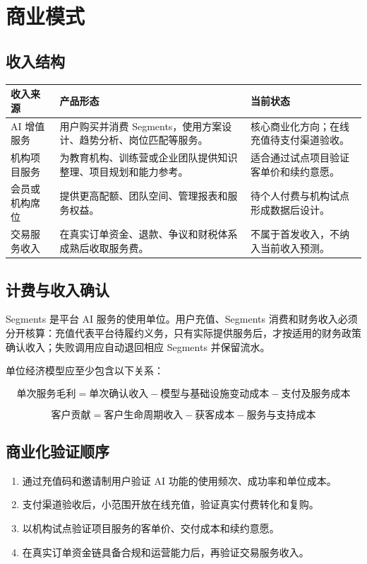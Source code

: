 \documentclass[12pt,a4paper,openany,fontset=fandol]{ctexrep}
\begin{document}
\chapter{商业模式}

\section{收入结构}

\begin{longtable}{p{3.2cm} p{5.2cm} p{5.3cm}}
\toprule
收入来源 & 产品形态 & 当前状态 \\
\midrule
AI 增值服务 & 用户购买并消费 Segments，使用方案设计、趋势分析、岗位匹配等服务。 & 核心商业化方向；在线充值待支付渠道验收。 \\
机构项目服务 & 为教育机构、训练营或企业团队提供知识整理、项目规划和能力参考。 & 适合通过试点项目验证客单价和续约意愿。 \\
会员或机构席位 & 提供更高配额、团队空间、管理报表和服务权益。 & 待个人付费与机构试点形成数据后设计。 \\
交易服务收入 & 在真实订单资金、退款、争议和财税体系成熟后收取服务费。 & 不属于首发收入，不纳入当前收入预测。 \\
\bottomrule
\end{longtable}

\section{计费与收入确认}

Segments 是平台 AI 服务的使用单位。用户充值、Segments 消费和财务收入必须分开核算：充值代表平台待履约义务，只有实际提供服务后，才按适用的财务政策确认收入；失败调用应自动退回相应 Segments 并保留流水。

单位经济模型应至少包含以下关系：

\[
\text{单次服务毛利}
=
\text{单次确认收入}
-
\text{模型与基础设施变动成本}
-
\text{支付及服务成本}
\]

\[
\text{客户贡献}
=
\text{客户生命周期收入}
-
\text{获客成本}
-
\text{服务与支持成本}
\]

\section{商业化验证顺序}

\begin{enumerate}
  \item 通过充值码和邀请制用户验证 AI 功能的使用频次、成功率和单位成本。
  \item 支付渠道验收后，小范围开放在线充值，验证真实付费转化和复购。
  \item 以机构试点验证项目服务的客单价、交付成本和续约意愿。
  \item 在真实订单资金链具备合规和运营能力后，再验证交易服务收入。
\end{enumerate}
\end{document}
